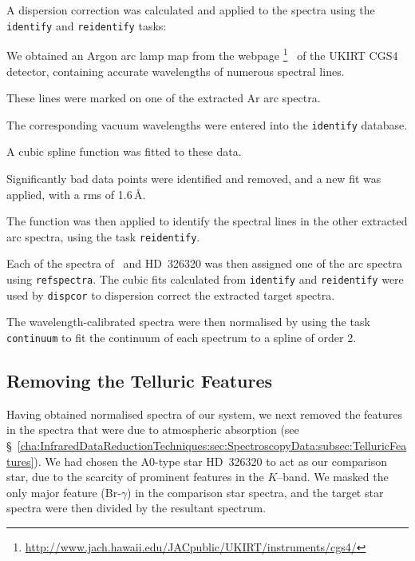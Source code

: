 \vspace{\myparskip}

A dispersion correction was calculated and applied to the spectra using the \texttt{identify} and \texttt{reidentify} tasks: %
\begin{inparaenum}[(i)]
\item
We obtained an Argon arc lamp map from the webpage%
\footnote{%
\label{cha:AccretionDiskContamination:sec:Spectroscopy:subsec:InitialReduction:foot:CGS4}
\url{http://www.jach.hawaii.edu/JACpublic/UKIRT/instruments/cgs4/} }%
\ of the UKIRT CGS4 detector, containing accurate wavelengths of
numerous spectral lines.
\item
These lines were marked on one of the
extracted Ar arc spectra.
\item
The corresponding vacuum wavelengths were
entered into the \texttt{identify} database.
\item
A cubic spline function
was fitted to these data.
\item
Significantly bad data points
were identified and removed, and a new fit was applied, with a rms of
1.6\,\AA.
\item The function was then applied to identify the spectral lines in the other
extracted arc spectra, using the task \texttt{reidentify}. %
\end{inparaenum}

\vspace{\myparskip}

Each of the spectra of \groj\ and \mbox{HD 326320}
was then assigned one of the arc spectra using
\texttt{refspectra}. The cubic fits calculated from \texttt{identify}
and \texttt{reidentify} were used by \texttt{dispcor} to dispersion
correct the extracted target spectra. %

\vspace{\myparskip}

The wavelength-calibrated spectra were then normalised by using the
task \texttt{continuum} to fit the continuum of each spectrum to a
spline of order 2. %


\subsection{Removing the Telluric Features}
\label{cha:AccretionDiskContamination:sec:Spectroscopy:subsec:TelluricFeatures}

Having obtained normalised spectra of our system, we next removed the features in the spectra that were due to atmospheric absorption (see \S~\ref{cha:InfraredDataReductionTechniques:sec:SpectroscopyData:subsec:TelluricFeatures}). We had chosen the A0-type star \mbox{HD 326320} to act as our comparison star, due to the scarcity of prominent features in the $K$--band. We masked the only major feature (Br-$\gamma$) in the comparison star spectra, and the target star spectra were then divided by the
resultant spectrum. %

